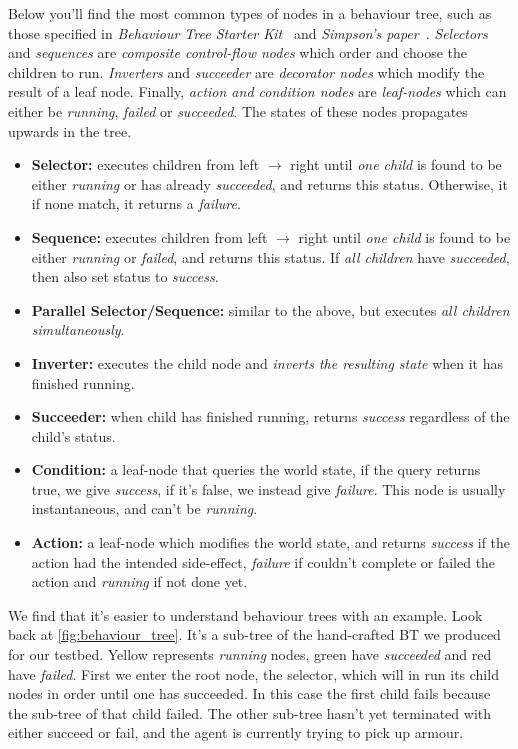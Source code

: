 \documentclass[a4paper, twocolumn]{article}
\begin{document}
        Below you'll find the most common types of nodes in a behaviour tree, such as those specified in \emph{Behaviour Tree Starter Kit}~\cite{champandard2014behaviour} and \emph{Simpson's paper}~\cite{simpson2014behavior}. \emph{Selectors} and \emph{sequences} are \emph{composite control-flow nodes} which order and choose the children to run. \emph{Inverters} and \emph{succeeder} are \emph{decorator nodes} which modify the result of a leaf node. Finally, \emph{action and condition nodes} are \emph{leaf-nodes} which can either be \emph{running}, \emph{failed} or \emph{succeeded}. The states of these nodes propagates upwards in the tree.

        \begin{itemize}
            \item{\textbf{Selector:} executes children from left \(\rightarrow\) right until \emph{one child} is found to be either \emph{running} or has already \emph{succeeded}, and returns this status. Otherwise, it if none match, it returns a \emph{failure}.}
            \item{\textbf{Sequence:} executes children from left \(\rightarrow\) right until \emph{one child} is found to be either \emph{running} or \emph{failed}, and returns this status. If \emph{all children} have \emph{succeeded}, then also set status to \emph{success}.}
            \item{\textbf{Parallel Selector/Sequence:} similar to the above, but executes \emph{all children simultaneously}.}
            \item{\textbf{Inverter:} executes the child node and \emph{inverts the resulting state} when it has finished running.}
            \item{\textbf{Succeeder:} when child has finished running, returns \emph{success} regardless of the child's status.}
            \item{\textbf{Condition:} a leaf-node that queries the world state, if the query returns true, we give \emph{success}, if it's false, we instead give \emph{failure}. This node is usually instantaneous, and can't be \emph{running}.}
            \item{\textbf{Action:} a leaf-node which modifies the world state, and returns \emph{success} if the action had the intended side-effect, \emph{failure} if couldn't complete or failed the action and \emph{running} if not done yet.}

        \end{itemize}

        We find that it's easier to understand behaviour trees with an example. Look back at \cref{fig:behaviour_tree}. It's a sub-tree of the hand-crafted BT we produced for our testbed. Yellow represents \emph{running} nodes, green have \emph{succeeded} and red have \emph{failed}. First we enter the root node, the selector, which will in run its child nodes in order until one has succeeded. In this case the first child fails because the sub-tree of that child failed. The other sub-tree hasn't yet terminated with either succeed or fail, and the agent is currently trying to pick up armour.
\end{document}
